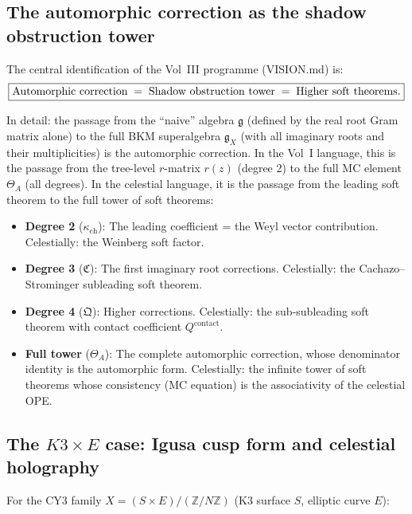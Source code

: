 \documentclass[11pt]{article}
\theoremstyle{definition}
\theoremstyle{remark}
\newcommand{\frakg}{\mathfrak{g}}
\begin{document}
\subsection{The automorphic correction as the shadow obstruction tower}

The central identification of the Vol~III programme (VISION.md) is:
\begin{equation}\label{eq:automorphic-shadow}
\boxed{%
\text{Automorphic correction}
\;=\;
\text{Shadow obstruction tower}
\;=\;
\text{Higher soft theorems.}}
\end{equation}

In detail: the passage from the ``naive'' algebra $\frakg$ (defined
by the real root Gram matrix alone) to the full BKM superalgebra
$\frakg_X$ (with all imaginary roots and their multiplicities)
is the automorphic correction. In the Vol~I language, this is the
passage from the tree-level $r$-matrix $r(z)$ (degree 2) to the
full MC element $\Theta_A$ (all degrees). In the celestial
language, it is the passage from the leading soft theorem to the
full tower of soft theorems:

\begin{itemize}
\item \textbf{Degree 2} ($\kappa_{\mathrm{ch}}$): The leading coefficient =
 the Weyl vector contribution. Celestially: the Weinberg soft
 factor.
\item \textbf{Degree 3} ($\mathfrak{C}$): The first imaginary root
 corrections. Celestially: the Cachazo--Strominger subleading
 soft theorem.
\item \textbf{Degree 4} ($\mathfrak{Q}$): Higher corrections.
 Celestially: the sub-subleading soft theorem with contact
 coefficient $Q^{\mathrm{contact}}$.
\item \textbf{Full tower} ($\Theta_A$): The complete automorphic
 correction, whose denominator identity is the automorphic form.
 Celestially: the infinite tower of soft theorems whose
 consistency (MC equation) is the associativity of the celestial
 OPE.
\end{itemize}

\subsection{The $K3 \times E$ case: Igusa cusp form and celestial holography}

For the CY3 family $X = (S \times E)/(\mathbb{Z}/N\mathbb{Z})$
(K3 surface $S$, elliptic curve $E$):
\end{document}
